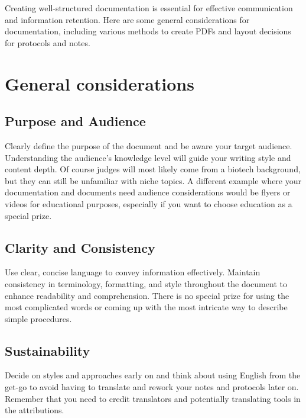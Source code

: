 
Creating well-structured documentation is essential for effective communication and information retention.
Here are some general considerations for documentation, including various methods to create PDFs and layout decisions for protocols and notes.
\section{General considerations} \label{sec:general-considerations}
\subsection*{Purpose and Audience}
Clearly define the purpose of the document and be aware your target audience.
Understanding the audience's knowledge level will guide your writing style and content depth.
Of course judges will most likely come from a biotech background, but they can still be unfamiliar with niche topics.
A different example where your documentation and documents need audience considerations would be flyers or videos for educational purposes, especially if you want to choose education as a special prize.

\subsection*{Clarity and Consistency}
Use clear, concise language to convey information effectively.
Maintain consistency in terminology, formatting, and style throughout the document to enhance readability and comprehension.
There is no special prize for using the most complicated words or coming up with the most intricate way to describe simple procedures.

\subsection*{Sustainability}
Decide on styles and approaches early on and think about using English from the get-go to avoid having to translate and rework your notes and protocols later on.
Remember that you need to credit translators and potentially translating tools in the attributions. 

